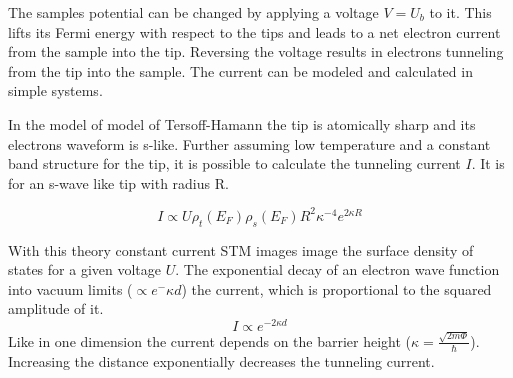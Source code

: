 \documentclass[
10pt,					%
a4paper,				%
twoside,				%
BCOR=8mm,				%
headings=normal,		%
headsepline,			%
footsepline,			%
plainfootsepline,		%
]{scrbook}
\begin{document}
The samples potential can be changed by applying a voltage $V=U_b$ to it. This lifts its Fermi energy with respect to the tips and leads to  a net electron current from the sample into the tip. Reversing the voltage results in electrons tunneling from the tip into the sample. The current can be modeled and calculated in simple systems. 

In the model of model of Tersoff-Hamann the tip is atomically sharp and its electrons waveform is s-like. Further assuming low temperature and a constant band structure for the tip, it is possible to calculate 
the tunneling current $I$. It is for an s-wave like tip with radius R. 

$$I \propto U \rho_t(E_F)\rho_s(E_F)R^2\kappa^{-4}e^{2\kappa R} $$

With this theory constant current STM images image the surface density of states for  a given voltage $U$. The exponential decay of an electron wave function into vacuum limits ($\propto e^-\kappa d$) the current, which is proportional to the squared amplitude of it. $$I\propto e^{-2\kappa d}$$
Like in one dimension the current depends on the barrier height ($\kappa=\frac{\sqrt{2m\Phi}}{\hbar}$). Increasing the distance exponentially decreases the tunneling current.


\end{document}
